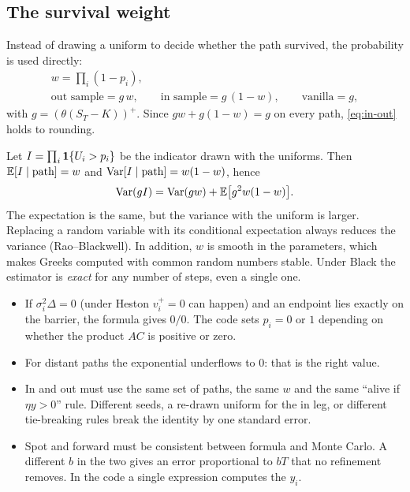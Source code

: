 \subsection{The survival weight}
Instead of drawing a uniform to decide whether the path survived, the probability is used directly:
\begin{equation}\label{eq:peso-bb}
\begin{gathered}
w=\prod_i(1-p_i),\\
\text{out sample}=g\,w,\qquad\text{in sample}=g\,(1-w),\qquad\text{vanilla}=g,
\end{gathered}
\end{equation}
with $g=(\theta(S_T-K))^+$. Since $gw+g(1-w)=g$ on every path, \eqref{eq:in-out} holds to rounding.
\begin{perche}[title={Why the weight and not the uniform}]
Let $I=\prod_i\mathbf{1}\{U_i>p_i\}$ be the indicator drawn with the uniforms. Then $\mathbb{E}[I\mid\text{path}]=w$ and
$\operatorname{Var}[I\mid\text{path}]=w(1-w)$, hence
\[
\operatorname{Var}(gI)=\operatorname{Var}(gw)+\mathbb{E}\big[g^2w(1-w)\big].
\]
The expectation is the same, but the variance with the uniform is larger. Replacing a random variable with its
conditional expectation always reduces the variance (Rao--Blackwell). In addition, $w$ is smooth in the parameters,
which makes Greeks computed with common random numbers stable. Under Black the estimator is \emph{exact} for any
number of steps, even a single one.
\end{perche}

\begin{attenzione}[title={Numerical details}]
\begin{itemize}
\item If $\sigma_i^2\Delta=0$ (under Heston $v_i^+=0$ can happen) and an endpoint lies exactly on the barrier, the
formula gives $0/0$. The code sets $p_i=0$ or $1$ depending on whether the product $AC$ is positive or zero.
\item For distant paths the exponential underflows to 0: that is the right value.
\item In and out must use the same set of paths, the same $w$ and the same ``alive if $\eta y>0$'' rule. Different
seeds, a re-drawn uniform for the in leg, or different tie-breaking rules break the identity by one standard error.
\item Spot and forward must be consistent between formula and Monte Carlo. A different $b$ in the two gives an error
proportional to $bT$ that no refinement removes. In the code a single expression computes the $y_i$.
\end{itemize}
\end{attenzione}

